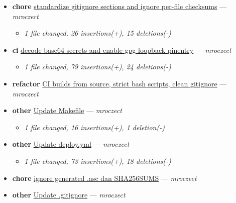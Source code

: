 \begin{itemize}[leftmargin=1.5em]
\begin{itemize}[leftmargin=1.5em]
  \end{itemize}
  \item \textbf{chore} \href{https://github.com/mroczect/mroczect.github.io/commit/fb23f6b293443358fc281f5e1f96153fe254642a}{standardize gitignore sections and ignore per-file checksums} --- \textit{mroczect}
  \begin{itemize}[leftmargin=1.5em]
    \item \small\textit{1 file changed, 26 insertions(+), 15 deletions(-)}
  \end{itemize}
  \item \textbf{ci} \href{https://github.com/mroczect/mroczect.github.io/commit/bfe648f1ced2c5e7bbedd796a3b16fa58e5255b0}{decode base64 secrets and enable gpg loopback pinentry} --- \textit{mroczect}
  \begin{itemize}[leftmargin=1.5em]
    \item \small\textit{1 file changed, 79 insertions(+), 24 deletions(-)}
  \end{itemize}
  \item \textbf{refactor} \href{https://github.com/mroczect/mroczect.github.io/commit/e60fb6453d78133d688bf6488a037639e66e136d}{CI builds from source, strict bash scripts, clean gitignore} --- \textit{mroczect}
  \item \textbf{other} \href{https://github.com/mroczect/mroczect.github.io/commit/b015c350f4d824ed2122b4114505a29ec1d632c0}{Update Makefile} --- \textit{mroczect}
  \begin{itemize}[leftmargin=1.5em]
    \item \small\textit{1 file changed, 16 insertions(+), 1 deletion(-)}
  \end{itemize}
  \item \textbf{other} \href{https://github.com/mroczect/mroczect.github.io/commit/5a4f33167632a1a1c7384da9cb378ce5106e74bc}{Update deploy.yml} --- \textit{mroczect}
  \begin{itemize}[leftmargin=1.5em]
    \item \small\textit{1 file changed, 73 insertions(+), 18 deletions(-)}
  \end{itemize}
  \item \textbf{chore} \href{https://github.com/mroczect/mroczect.github.io/commit/bd8d68a85626adb6c778d76e3365c31e6218e609}{ignore generated .asc dan SHA256SUMS} --- \textit{mroczect}
  \item \textbf{other} \href{https://github.com/mroczect/mroczect.github.io/commit/c84d85691afdb0e3cf83ee63bb8c1bcc9041c06a}{Update .gitignore} --- \textit{mroczect}

\end{itemize}
